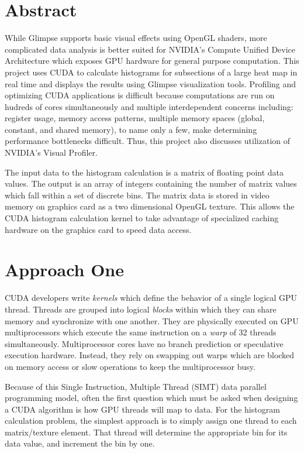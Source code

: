 \documentclass{article}
\begin{document}
\section{Abstract}\label{abstract}

While Glimpse supports basic visual effects using OpenGL shaders, more complicated data analysis is better suited for NVIDIA's Compute Unified Device Architecture\cite{cuda-zone} which exposes GPU hardware for general purpose computation. This project uses CUDA to calculate histograms for subsections of a large heat map in real time and displays the results using Glimpse visualization tools. Profiling and optimizing CUDA applications is difficult because computations are run on hudreds of cores simultaneously and multiple interdependent concerns including: register usage, memory access patterns, multiple memory spaces (global, constant, and shared memory), to name only a few, make determining performance bottlenecks difficult. Thus, this project also discusses utilization of NVIDIA's Visual Profiler\cite{nvidia-visual-profiler}.

The input data to the histogram calculation is a matrix of floating point data values. The output is an array of integers containing the number of matrix values which fall within a set of discrete bins. The matrix data is stored in video memory on graphics card as a two dimensional OpenGL texture. This allows the CUDA histogram calculation kernel to take advantage of specialized caching hardware on the graphics card to speed data access.

\section{Approach One}\label{approach1}

CUDA developers write \emph{kernels} which define the behavior of a single logical GPU thread. Threads are grouped into logical \emph{blocks} within which they can share memory and synchronize with one another. They are physically executed on GPU multiprocessors which execute the same instruction on a \emph{warp} of 32 threads simultaneously. Multiprocessor cores have no branch prediction or speculative execution hardware. Instead, they rely on swapping out warps which are blocked on memory access or slow operations to keep the multiprocessor busy. 

Because of this Single Instruction, Multiple Thread (SIMT) data parallel programming model, often the first question which must be asked when designing a CUDA algorithm is how GPU threads will map to data. For the histogram calculation problem, the simplest approach is to simply assign one thread to each matrix/texture element. That thread will determine the appropriate bin for its data value, and increment the bin by one.
\end{document}
